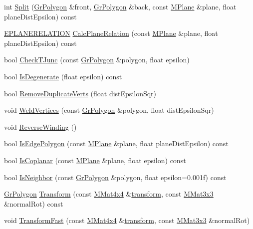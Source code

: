 \begin{CompactItemize}
\begin{CompactItemize}
\item 
int \hyperlink{class_gr_polygon_71ca719cd4addf47d5c170691a1738f2}{Split} (\hyperlink{class_gr_polygon}{GrPolygon} \&front, \hyperlink{class_gr_polygon}{GrPolygon} \&back, const \hyperlink{class_m_plane}{MPlane} \&plane, float planeDistEpsilon) const 
\item 
\hyperlink{class_gr_polygon_3e8aa04f4841547a5c8a055e1722204b}{EPLANERELATION} \hyperlink{class_gr_polygon_fc680ccb262eb784f0ba74deac1c36b0}{CalcPlaneRelation} (const \hyperlink{class_m_plane}{MPlane} \&plane, float planeDistEpsilon) const 
\item 
bool \hyperlink{class_gr_polygon_30966480a994228549847bb03e9f1874}{CheckTJunc} (const \hyperlink{class_gr_polygon}{GrPolygon} \&polygon, float epsilon)
\item 
bool \hyperlink{class_gr_polygon_d87c32f12d3fd9419eb6e7f0a8415a38}{IsDegenerate} (float epsilon) const 
\item 
bool \hyperlink{class_gr_polygon_4a31719da237646860956200e58b0385}{RemoveDuplicateVerts} (float distEpsilonSqr)
\item 
void \hyperlink{class_gr_polygon_d590f512fd5dc8ff24377ed123df129a}{WeldVertices} (const \hyperlink{class_gr_polygon}{GrPolygon} \&polygon, float distEpsilonSqr)
\item 
void \hyperlink{class_gr_polygon_20c41a3935e2256793edd844b351b750}{ReverseWinding} ()
\item 
bool \hyperlink{class_gr_polygon_3946b5bfc9871915023821b963455b36}{IsEdgePolygon} (const \hyperlink{class_m_plane}{MPlane} \&plane, float planeDistEpsilon) const 
\item 
bool \hyperlink{class_gr_polygon_f6f970043ece48bc218ff5bc62fa66a5}{IsCoplanar} (const \hyperlink{class_m_plane}{MPlane} \&plane, float epsilon) const 
\item 
bool \hyperlink{class_gr_polygon_7cdc587de8a706861b8ebecb3078e0d0}{IsNeighbor} (const \hyperlink{class_gr_polygon}{GrPolygon} \&polygon, float epsilon=0.001f) const 
\item 
\hyperlink{class_gr_polygon}{GrPolygon} \hyperlink{class_gr_polygon_c8fc7a0caec236dfac7f44abc38a17e5}{Transform} (const \hyperlink{class_m_mat4x4}{MMat4x4} \&\hyperlink{glext__bak_8h_07993c0d92c1aeeb357ba0495c8b5325}{transform}, const \hyperlink{class_m_mat3x3}{MMat3x3} \&normalRot) const 
\item 
void \hyperlink{class_gr_polygon_312706662a832bd7fdc652fb55bcdd56}{TransformFast} (const \hyperlink{class_m_mat4x4}{MMat4x4} \&\hyperlink{glext__bak_8h_07993c0d92c1aeeb357ba0495c8b5325}{transform}, const \hyperlink{class_m_mat3x3}{MMat3x3} \&normalRot)

\end{CompactItemize}
\end{CompactItemize}
